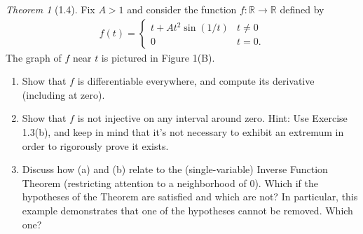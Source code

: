 \documentclass[12pt]{article}
\theoremstyle{remark}
\theoremstyle{named}
\newtheorem*{theorem}{Theorem}
\newcommand{\R}{\mathbb R}
\begin{document}
\begin{theorem}[1.4]
    Fix \(A > 1\) and consider the function \(f : \R \to \R\) defined by 
    \begin{align*}
        f(t) = \begin{cases}
            t + At^2 \sin(1/t) & t \neq 0 \\
            0 & t = 0.
        \end{cases}
    \end{align*}
    The graph of \(f\) near \(t\) is pictured in Figure 1(B).
    \begin{enumerate}
        \item Show that \(f\) is differentiable everywhere, and compute its derivative (including at zero).
        \item Show that \(f\) is not injective on any interval around zero. Hint: Use Exercise 1.3(b), and keep in mind that it's not necessary to exhibit an extremum in order to rigorously prove it exists.
        \item Discuss how (a) and (b) relate to the (single-variable) Inverse Function Theorem (restricting attention to a neighborhood of \(0\)). Which if the hypotheses of the Theorem are satisfied and which are not? In particular, this example demonstrates that one of the hypotheses cannot be removed. Which one?
    \end{enumerate}
\end{theorem}
\end{document}
